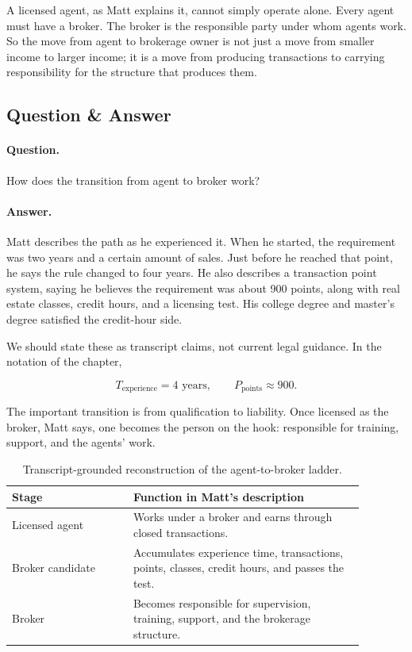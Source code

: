 A licensed agent, as Matt explains it, cannot simply operate alone. Every agent must have a broker. The broker is the responsible party under whom agents work. So the move from agent to brokerage owner is not just a move from smaller income to larger income; it is a move from producing transactions to carrying responsibility for the structure that produces them.

\subsection{Question \& Answer}

\paragraph{Question.}
How does the transition from agent to broker work?

\paragraph{Answer.}
Matt describes the path as he experienced it. When he started, the requirement was two years and a certain amount of sales. Just before he reached that point, he says the rule changed to four years. He also describes a transaction point system, saying he believes the requirement was about 900 points, along with real estate classes, credit hours, and a licensing test. His college degree and master's degree satisfied the credit-hour side.

We should state these as transcript claims, not current legal guidance. In the notation of the chapter,

\begin{equation}
T_{\text{experience}}=4\text{ years},
\qquad
P_{\text{points}}\approx 900 .
\end{equation}

The important transition is from qualification to liability. Once licensed as the broker, Matt says, one becomes the person on the hook: responsible for training, support, and the agents' work.

\begin{table}
\centering
\begin{tabular}{|p{0.30\linewidth}|p{0.58\linewidth}|}
\hline
Stage & Function in Matt's description \\
\hline
Licensed agent & Works under a broker and earns through closed transactions. \\
\hline
Broker candidate & Accumulates experience time, transactions, points, classes, credit hours, and passes the test. \\
\hline
Broker & Becomes responsible for supervision, training, support, and the brokerage structure. \\
\hline
\end{tabular}
\caption{Transcript-grounded reconstruction of the agent-to-broker ladder.}
\end{table}

